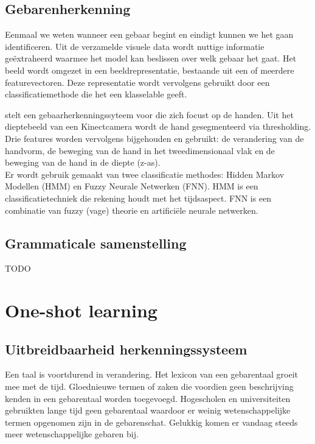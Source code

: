 \subsection{Gebarenherkenning}
Eenmaal we weten wanneer een gebaar begint en eindigt kunnen we het gaan identificeren. Uit de verzamelde visuele data wordt nuttige informatie ge\"extraheerd waarmee het model kan beslissen over welk gebaar het gaat. Het beeld wordt omgezet in een beeldrepresentatie, bestaande uit een of meerdere featurevectoren. Deze representatie wordt vervolgens gebruikt door een classificatiemethode die het een klasselable geeft.

\npar \cite{gesture-FNN-HMM} stelt een gebaarherkenningssyteem voor die zich focust op de handen. Uit het dieptebeeld van een Kinectcamera wordt de hand gesegmenteerd via thresholding. Drie features worden vervolgens bijgehouden en gebruikt: de verandering van de handvorm, de beweging van de hand in het tweedimensionaal vlak en de beweging van de hand in de diepte (z-as).
\\Er wordt gebruik gemaakt van twee classificatie methodes: Hidden Markov Modellen (HMM) en Fuzzy Neurale Netwerken (FNN). HMM is een classificatietechniek die rekening houdt met het tijdsaspect. FNN is een combinatie van fuzzy (vage) theorie en artifici\"ele neurale netwerken.

\subsection{Grammaticale samenstelling}
TODO
%

\section{One-shot learning}

\subsection{Uitbreidbaarheid herkenningssysteem}
Een taal is voortdurend in verandering.
Het lexicon van een gebarentaal groeit mee met de tijd. Gloednieuwe termen of zaken die voordien geen beschrijving kenden in een gebarentaal worden toegevoegd. Hogescholen en universiteiten gebruikten lange tijd geen gebarentaal waardoor er weinig wetenschappelijke termen opgenomen zijn in de gebarenschat. Gelukkig komen er vandaag steeds meer wetenschappelijke gebaren bij.

